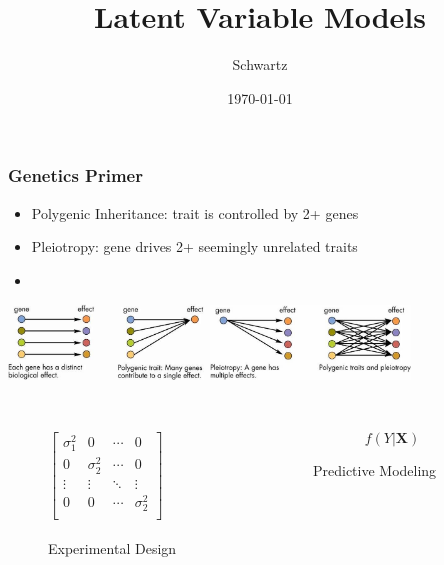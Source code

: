 \documentclass[xcolor={dvipsnames}]{beamer}
\title{Latent Variable Models}
\author{Schwartz}
\date{\today}
\begin{document}
\frame{\titlepage}


\frame
{
\frametitle{Genetics Primer}

\begin{itemize}
\item Polygenic Inheritance:  trait is controlled by 2+ genes 
\item Pleiotropy: gene drives 2+ seemingly unrelated traits 
\item[]
\end{itemize}

\includegraphics[width=2.1in]{stuff/polygenicA.jpg}\includegraphics[width=2.1in]{stuff/polygenic.jpg} \\${}$\\


\begin{columns}
\begin{column}{.3\textwidth}

\begin{figure}
\tiny
\centering

$\left[\begin{array}{cccc}
\sigma_1^2 & 0 & \cdots & 0\\
0 & \sigma_2^2 &  \cdots & 0\\
\vdots & \vdots &  \ddots & \vdots \\
0 & 0 &  \cdots & \sigma_2^2\\
\end{array}\right]$\\${}$\\

\scriptsize
Experimental Design
\end{figure}

\end{column}
\begin{column}{.2\textwidth}
\large
$$f(Y|{\boldsymbol X})$$
\vspace*{-2em}
\begin{figure}[h!]
\centering
\scriptsize
Predictive Modeling
\end{figure}


\end{column}
\end{columns}}
\end{document}
